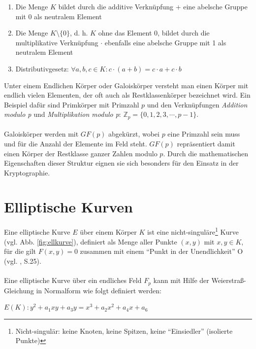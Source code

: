 \begin{enumerate}
  \item Die Menge $K$ bildet durch die additive Verknüpfung $+$ eine abelsche Gruppe
mit 0 als neutralem Element
  \item Die Menge $K\setminus\{0\}$, d. h. $K$ ohne das Element 0, bildet durch die multiplikative Verknüpfung $\cdot$ ebenfalls eine abelsche Gruppe mit 1 als neutralem Element
  \item Distributivgesetz: $ \forall a,b,c \in K: c \cdot (a + b) = c \cdot a + c \cdot b $ \\
\end{enumerate}

Unter einem Endlichen Körper oder Galoiskörper versteht man einen Körper mit endlich vielen Elementen, der oft auch als Restklassenkörper bezeichnet wird. Ein Beispiel dafür sind Primkörper mit Primzahl $p$ und den Verknüpfungen \textit{Addition modulo p} und \textit{Multiplikation modulo p}: $\mathbb{Z}_p = \{0,1,2,3,\cdots,p-1\}$. 
\\ \\
Galoiskörper werden mit $GF(p)$ abgekürzt, wobei $p$ eine Primzahl sein muss und für die Anzahl der Elemente im Feld steht. $GF(p)$ repräsentiert damit einen Körper der Restklasse ganzer Zahlen modulo $p$. Durch die mathematischen Eigenschaften dieser Struktur eignen sie sich besonders für den Einsatz in der Kryptographie.

\section{Elliptische Kurven} 
\label{sec:ell}

Eine elliptische Kurve $E$ über einem Körper $K$ ist eine nicht-singuläre\footnote{Nicht-singulär: keine Knoten, keine Spitzen, keine ``Einsiedler'' (isolierte Punkte)} Kurve (vgl. Abb. \ref{fig:ellkurve}), definiert als Menge aller Punkte $(x,y)$ mit $x,y \in K$, für die gilt $F(x,y)=0$ zusammen mit einem ``Punkt in der Unendlichkeit'' O (vgl. \cite{grebe}, S.25).
\\ \\
Eine elliptische Kurve über ein endliches Feld $F_p$ kann mit Hilfe der Weierstraß-Gleichung in Normalform wie folgt definiert werden:

\begin{center}
$E(K): y^2 + a_1 x y + a_3 y = x^3 + a_2 x^2 + a_4 x + a_6 $
\end{center}

